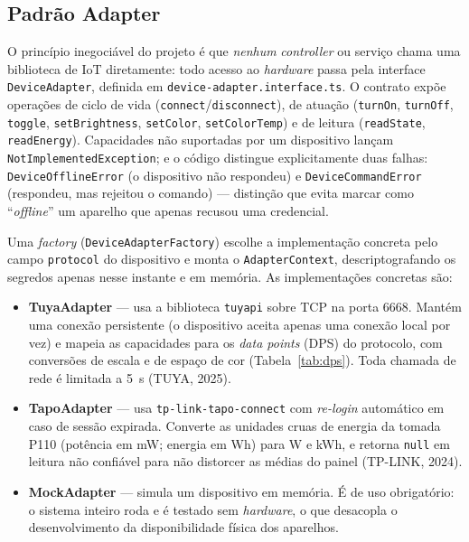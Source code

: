 \subsection{Padrão Adapter}

O princípio inegociável do projeto é que \emph{nenhum} \emph{controller} ou
serviço chama uma biblioteca de IoT diretamente: todo acesso ao \emph{hardware}
passa pela interface \texttt{DeviceAdapter}, definida em
\texttt{device-adapter.interface.ts}. O contrato expõe operações de ciclo de
vida (\texttt{connect}/\texttt{disconnect}), de atuação (\texttt{turnOn},
\texttt{turnOff}, \texttt{toggle}, \texttt{setBrightness}, \texttt{setColor},
\texttt{setColorTemp}) e de leitura (\texttt{readState}, \texttt{readEnergy}).
Capacidades não suportadas por um dispositivo lançam
\texttt{NotImplementedException}; e o código distingue explicitamente duas
falhas: \texttt{DeviceOfflineError} (o dispositivo não respondeu) e
\texttt{DeviceCommandError} (respondeu, mas rejeitou o comando) --- distinção
que evita marcar como ``\emph{offline}'' um aparelho que apenas recusou uma
credencial.

Uma \emph{factory} (\texttt{DeviceAdapterFactory}) escolhe a implementação
concreta pelo campo \texttt{protocol} do dispositivo e monta o
\texttt{AdapterContext}, descriptografando os segredos apenas nesse instante e
em memória. As implementações concretas são:

\begin{itemize}
  \item \textbf{TuyaAdapter} --- usa a biblioteca \texttt{tuyapi} sobre TCP na
    porta 6668. Mantém uma conexão persistente (o dispositivo aceita apenas uma
    conexão local por vez) e mapeia as capacidades para os \emph{data points}
    (DPS) do protocolo, com conversões de escala e de espaço de cor
    (Tabela~\ref{tab:dps}). Toda chamada de rede é limitada a 5~s (TUYA, 2025).
  \item \textbf{TapoAdapter} --- usa \texttt{tp-link-tapo-connect} com
    \emph{re-login} automático em caso de sessão expirada. Converte as unidades
    cruas de energia da tomada P110 (potência em mW; energia em Wh) para W e
    kWh, e retorna \texttt{null} em leitura não confiável para não distorcer as
    médias do painel (TP-LINK, 2024).
  \item \textbf{MockAdapter} --- simula um dispositivo em memória. É de uso
    obrigatório: o sistema inteiro roda e é testado sem \emph{hardware}, o que
    desacopla o desenvolvimento da disponibilidade física dos aparelhos.
\end{itemize}

